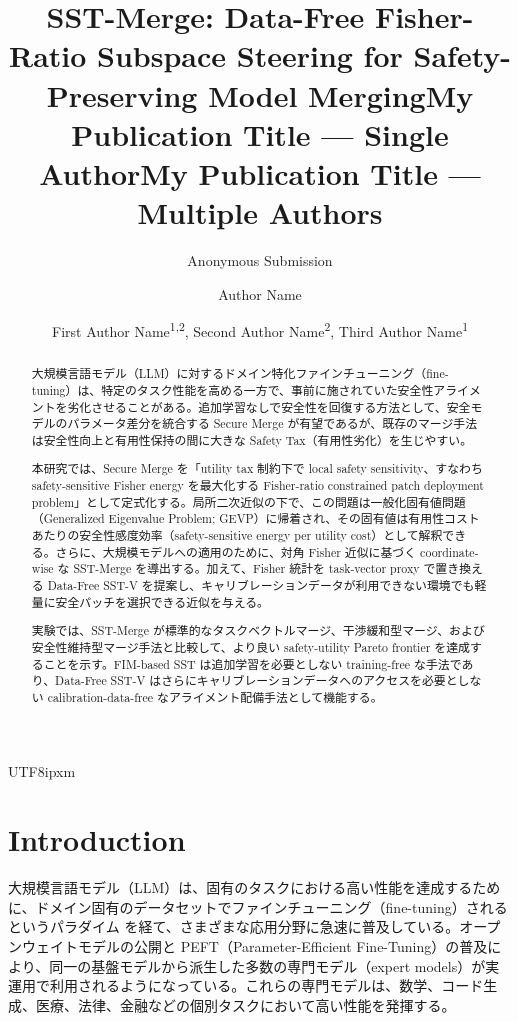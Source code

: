 \documentclass[letterpaper]{article} %
\title{SST-Merge: Data-Free Fisher-Ratio Subspace Steering for Safety-Preserving Model Merging}
\author{
    Anonymous Submission
}
\title{My Publication Title --- Single Author}
\author {
    Author Name
}
\title{My Publication Title --- Multiple Authors}
\author {
    First Author Name\textsuperscript{\rm 1,\rm 2}\equalcontrib,
    Second Author Name\textsuperscript{\rm 2}\equalcontrib,
    Third Author Name\textsuperscript{\rm 1}\corresponding
}
\begin{document}
\begin{CJK*}{UTF8}{ipxm}

\maketitle

\begin{abstract}
大規模言語モデル（LLM）に対するドメイン特化ファインチューニング（fine-tuning）は、特定のタスク性能を高める一方で、事前に施されていた安全性アライメントを劣化させることがある。追加学習なしで安全性を回復する方法として、安全モデルのパラメータ差分を統合する Secure Merge が有望であるが、既存のマージ手法は安全性向上と有用性保持の間に大きな Safety Tax（有用性劣化）を生じやすい。

本研究では、Secure Merge を「utility tax 制約下で local safety sensitivity、すなわち safety-sensitive Fisher energy を最大化する Fisher-ratio constrained patch deployment problem」として定式化する。局所二次近似の下で、この問題は一般化固有値問題（Generalized Eigenvalue Problem; GEVP）に帰着され、その固有値は有用性コストあたりの安全性感度効率（safety-sensitive energy per utility cost）として解釈できる。さらに、大規模モデルへの適用のために、対角 Fisher 近似に基づく coordinate-wise な SST-Merge を導出する。加えて、Fisher 統計を task-vector proxy で置き換える Data-Free SST-V を提案し、キャリブレーションデータが利用できない環境でも軽量に安全パッチを選択できる近似を与える。

実験では、SST-Merge が標準的なタスクベクトルマージ、干渉緩和型マージ、および安全性維持型マージ手法と比較して、より良い safety-utility Pareto frontier を達成することを示す。FIM-based SST は追加学習を必要としない training-free な手法であり、Data-Free SST-V はさらにキャリブレーションデータへのアクセスを必要としない calibration-data-free なアライメント配備手法として機能する。
\end{abstract}

\section{Introduction}
大規模言語モデル（LLM）は、固有のタスクにおける高い性能を達成するために、ドメイン固有のデータセットでファインチューニング（fine-tuning）されるというパラダイム\citep{devlin2019bert, raffel2020t5, brown2020language, touvron2023llama2} を経て、さまざまな応用分野に急速に普及している。オープンウェイトモデルの公開と PEFT（Parameter-Efficient Fine-Tuning）の普及により、同一の基盤モデルから派生した多数の専門モデル（expert models）が実運用で利用されるようになっている\citep{wolf2019transformers}。これらの専門モデルは、数学、コード生成、医療、法律、金融などの個別タスクにおいて高い性能を発揮する。


\end{CJK*}
\end{document}
